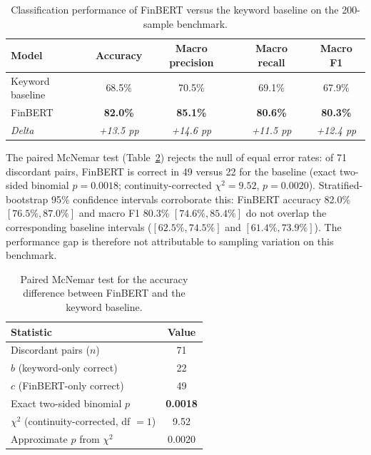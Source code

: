 \documentclass{aims}
\numberwithin{equation}{section}
\begin{document}
\begin{table}[ht]
\centering
\caption{Classification performance of FinBERT versus the keyword baseline on the
200-sample benchmark.}
\label{tab:summary}
\begin{tabular}{lcccc}
\toprule
\textbf{Model} & \textbf{Accuracy} & \textbf{Macro precision} & \textbf{Macro recall} & \textbf{Macro F1} \\
\midrule
Keyword baseline & 68.5\% & 70.5\% & 69.1\% & 67.9\% \\
FinBERT & \textbf{82.0\%} & \textbf{85.1\%} & \textbf{80.6\%} & \textbf{80.3\%} \\
\midrule
\textit{Delta} & \textit{+13.5 pp} & \textit{+14.6 pp} & \textit{+11.5 pp} & \textit{+12.4 pp} \\
\bottomrule
\end{tabular}
\end{table}

The paired McNemar test (Table~\ref{tab:mcnemar}) rejects the null of equal error
rates: of 71 discordant pairs, FinBERT is correct in 49 versus 22 for the baseline
(exact two-sided binomial $p = 0.0018$; continuity-corrected $\chi^2 = 9.52$,
$p = 0.0020$). Stratified-bootstrap 95\% confidence intervals corroborate this:
FinBERT accuracy 82.0\% $[76.5\%, 87.0\%]$ and macro F1 80.3\% $[74.6\%, 85.4\%]$ do
not overlap the corresponding baseline intervals ($[62.5\%, 74.5\%]$ and
$[61.4\%, 73.9\%]$). The performance gap is therefore not attributable to sampling
variation on this benchmark.

\begin{table}[ht]
\centering
\caption{Paired McNemar test for the accuracy difference between FinBERT and the
keyword baseline.}
\label{tab:mcnemar}
\begin{tabular}{lc}
\toprule
\textbf{Statistic} & \textbf{Value} \\
\midrule
Discordant pairs ($n$) & 71 \\
$b$ (keyword-only correct) & 22 \\
$c$ (FinBERT-only correct) & 49 \\
Exact two-sided binomial $p$ & \textbf{0.0018} \\
$\chi^2$ (continuity-corrected, df $=1$) & 9.52 \\
Approximate $p$ from $\chi^2$ & 0.0020 \\
\bottomrule
\end{tabular}
\end{table}
\end{document}
